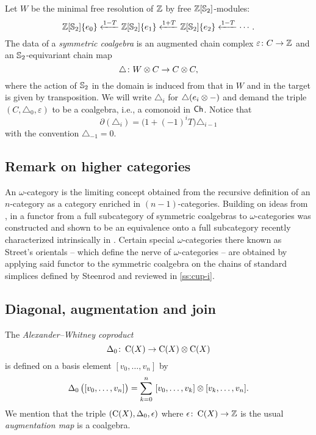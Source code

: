 Let $W$ be the minimal free resolution of $\mathbb{Z}$ by free $\mathbb{Z}[\mathbb{S}_2]$-modules:
\[
\mathbb{Z}[\mathbb{S}_2]\{e_0\} \xleftarrow{1-T} \mathbb{Z}[\mathbb{S}_2]\{e_1\} \xleftarrow{1+T} \mathbb{Z}[\mathbb{S}_2]\{e_2\} \xleftarrow{1-T} \dotsb.
\]
The data of a \textit{symmetric coalgebra} is an augmented chain complex $\varepsilon \colon C \to \mathbb{Z}$ and an $\mathbb{S}_2$-equivariant chain map
\[
\triangle \colon W \otimes C \to C \otimes C,
\]
where the action of $\mathbb{S}_2$ in the domain is induced from that in $W$ and in the target is given by transposition.
We will write $\triangle_i$ for $\triangle(e_i \otimes -)$ and demand the triple $(C, \triangle_0, \varepsilon)$ to be a coalgebra, i.e., a comonoid in $\mathsf{Ch}$.
Notice that
\[
\partial(\triangle_i) = \big( 1+(-1)^i T \big) \triangle_{i-1}
\]
with the convention $\triangle_{-1} = 0$.

\subsection{Remark on higher categories}
\label{ss:higher categories}

An $\omega$-category is the limiting concept obtained from the recursive definition of an $n$-category as a category enriched in $(n-1)$-categories.
Building on ideas from \cite{brown1981cubes, kapranov1991polycategory, steiner2004omega}, in \cite{medina2020globular} a functor from a full subcategory of symmetric coalgebras to $\omega$-categories was constructed and shown to be an equivalence onto a full subcategory recently characterized intrinsically in \cite{ozornova2022steiner}.
Certain special $\omega$-categories there known as Street's orientals \cite{street1987orientals} -- which define the nerve of $\omega$-categories -- are obtained by applying said functor to the symmetric coalgebra on the chains of standard simplices defined by Steenrod and reviewed in \cref{ss:cup-i}.

\subsection{Diagonal, augmentation and join}

The \textit{Alexander--Whitney coproduct}
\[
\operatorname{\Delta}_0 \colon \operatorname{C}(X) \to \operatorname{C}(X) \otimes \operatorname{C}(X)
\]
is defined on a basis element $[v_0, \dots, v_n]$ by
\begin{equation*}\label{e:alexander-whitney coalgebra}
	\operatorname{\Delta}_0 \big( [v_0, \dots, v_n] \big) =
	\sum_{k=0}^n \ [v_0, \dots, v_k] \otimes [v_k, \dots, v_n].
\end{equation*}
We mention that the triple $(\operatorname{C}(X), \operatorname{\Delta}_0, \operatorname{\epsilon})$ where $\operatorname{\epsilon} \colon \operatorname{C}(X) \to \mathbb{Z}$ is the usual \textit{augmentation map} is a coalgebra.

